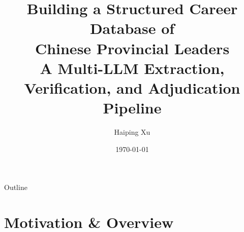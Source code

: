 \documentclass[aspectratio=169, 10pt]{beamer}
\title[Provincial Officials Database Pipeline]{%
  \textbf{Building a Structured Career Database of}\\
  \textbf{Chinese Provincial Leaders}\\[4pt]
  \normalsize A Multi-LLM Extraction, Verification, and Adjudication Pipeline
}
\author{Haiping Xu}
\institute{Work in progress}
\date{\today}
\begin{document}
\begin{frame}
  \titlepage
\end{frame}

\begin{frame}{Outline}
  \tableofcontents
\end{frame}

\section{Motivation \& Overview}
\end{document}

